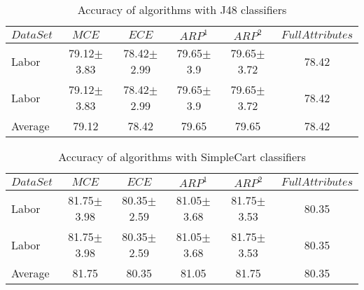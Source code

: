 \documentclass[final,5p,times]{elsarticle}
\begin{document}
\begin{table*}[htbp]
\centering
\caption{Accuracy of  algorithms with J48 classifiers}
\label{tab:reduction:accresults:j48}
	\begin{tabular}{lccccc}
	\toprule
	$DataSet$ &
	$MCE$ &
	$ECE$ &
	$ARP^1$ &
	$ARP^2$ &
	$FullAttributes$ \\
	\midrule
	Labor	&	79.12$\pm$3.83	&	78.42$\pm$2.99	&	79.65$\pm$3.9	&	79.65$\pm$3.72	&	78.42	\\
	Labor	&	79.12$\pm$3.83	&	78.42$\pm$2.99	&	79.65$\pm$3.9	&	79.65$\pm$3.72	&	78.42	\\
	\midrule
	Average	&	79.12	&	78.42	&	79.65	&	79.65	&	78.42	\\
	\bottomrule
	\end{tabular}
\end{table*}



\begin{table*}[htbp]
\centering
\caption{Accuracy of  algorithms with SimpleCart classifiers}
\label{tab:reduction:accresults:simplecart}
	\begin{tabular}{lccccc}
	\toprule
	$DataSet$ &
	$MCE$ &
	$ECE$ &
	$ARP^1$ &
	$ARP^2$ &
	$FullAttributes$ \\
	\midrule
	Labor	&	81.75$\pm$3.98	&	80.35$\pm$2.59	&	81.05$\pm$3.68	&	81.75$\pm$3.53	&	80.35	\\
	Labor	&	81.75$\pm$3.98	&	80.35$\pm$2.59	&	81.05$\pm$3.68	&	81.75$\pm$3.53	&	80.35	\\
	\midrule
	Average	&	81.75	&	80.35	&	81.05	&	81.75	&	80.35	\\
	\bottomrule
	\end{tabular}
\end{table*}
\end{document}
